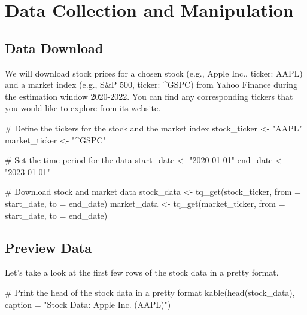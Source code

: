 \documentclass[
]{scrartcl}
\newenvironment{Shaded}{\begin{snugshade}}{\end{snugshade}}
\newcommand{\AttributeTok}[1]{\textcolor[rgb]{0.40,0.45,0.13}{#1}}
\newcommand{\CommentTok}[1]{\textcolor[rgb]{0.37,0.37,0.37}{#1}}
\newcommand{\FunctionTok}[1]{\textcolor[rgb]{0.28,0.35,0.67}{#1}}
\newcommand{\NormalTok}[1]{\textcolor[rgb]{0.00,0.23,0.31}{#1}}
\newcommand{\OtherTok}[1]{\textcolor[rgb]{0.00,0.23,0.31}{#1}}
\newcommand{\StringTok}[1]{\textcolor[rgb]{0.13,0.47,0.30}{#1}}
\begin{document}
\section{Data Collection and
Manipulation}\label{data-collection-and-manipulation}

\subsection{\texorpdfstring{\textbf{Data
Download}}{Data Download}}\label{data-download}

We will download stock prices for a chosen stock (e.g., Apple Inc.,
ticker: AAPL) and a market index (e.g., S\&P 500, ticker: \^{}GSPC) from
Yahoo Finance during the estimation window 2020-2022. You can find any
corresponding tickers that you would like to explore from its
\href{https://finance.yahoo.com/}{website}.

\begin{Shaded}
\begin{Highlighting}[]
\CommentTok{\# Define the tickers for the stock and the market index}
\NormalTok{stock\_ticker }\OtherTok{\textless{}{-}} \StringTok{"AAPL"}
\NormalTok{market\_ticker }\OtherTok{\textless{}{-}} \StringTok{"\^{}GSPC"}

\CommentTok{\# Set the time period for the data}
\NormalTok{start\_date }\OtherTok{\textless{}{-}} \StringTok{"2020{-}01{-}01"}
\NormalTok{end\_date }\OtherTok{\textless{}{-}} \StringTok{"2023{-}01{-}01"}

\CommentTok{\# Download stock and market data}
\NormalTok{stock\_data }\OtherTok{\textless{}{-}} \FunctionTok{tq\_get}\NormalTok{(stock\_ticker, }\AttributeTok{from =}\NormalTok{ start\_date, }\AttributeTok{to =}\NormalTok{ end\_date)}
\NormalTok{market\_data }\OtherTok{\textless{}{-}} \FunctionTok{tq\_get}\NormalTok{(market\_ticker, }\AttributeTok{from =}\NormalTok{ start\_date, }\AttributeTok{to =}\NormalTok{ end\_date)}
\end{Highlighting}
\end{Shaded}

\subsection{\texorpdfstring{\textbf{Preview
Data}}{Preview Data}}\label{preview-data}

Let's take a look at the first few rows of the stock data in a pretty
format.

\begin{Shaded}
\begin{Highlighting}[]
\CommentTok{\# Print the head of the stock data in a pretty format}
\FunctionTok{kable}\NormalTok{(}\FunctionTok{head}\NormalTok{(stock\_data), }\AttributeTok{caption =} \StringTok{"Stock Data: Apple Inc. (AAPL)"}\NormalTok{)}
\end{Highlighting}
\end{Shaded}
\end{document}
